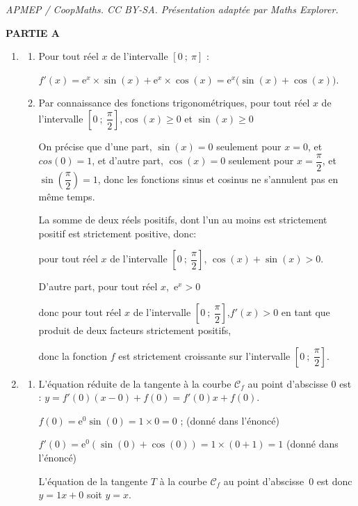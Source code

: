 \documentclass[10pt]{article}
\providecommand{\e}{{\mathrm{e}}}
\begin{document}
\noindent\textit{APMEP / CoopMaths. CC BY-SA. Présentation adaptée par Maths Explorer.}\par\medskip
\medskip

\textbf{PARTIE A}

\medskip

\begin{enumerate}
\item
	\begin{enumerate}
		\item Pour tout réel $x$ de l'intervalle $[0~;~\pi]$ :

$f'(x) = \e^x \times \sin(x) +\e^x \times  \cos(x) = \e^x \big( \sin(x) +\cos(x)\big)$.
		\item Par connaissance des fonctions trigonométriques, pour tout réel $x$ de l'intervalle $\left[0~;~\dfrac{\pi}{2}\right]$,\quad $\cos(x)\geqslant 0$ et $\sin(x)\geqslant 0$

On précise que d'une part, $\sin(x) = 0$ seulement pour $x = 0$, et $cos(0) = 1$, et d'autre part, $\cos(x) = 0$ seulement pour $x = \dfrac{\pi}{2}$, et $\sin\left(\dfrac{\pi}{2}\right)  =1$, donc les fonctions sinus et cosinus ne s'annulent pas en même temps.

La somme de deux réels positifs, dont l'un au moins est strictement positif est strictement positive, donc:

pour tout réel $x$ de l'intervalle $\left[0~;~\dfrac{\pi}{2}\right]$, \quad $\cos(x)+ \sin(x)> 0$.

D'autre part, pour tout réel $x$,\, $\e^{x} > 0$

donc pour tout réel $x$ de l'intervalle $\left[0~;~\dfrac{\pi}{2}\right]$,\quad $f'(x)> 0$ \quad en tant que produit de deux facteurs strictement positifs,

donc  la fonction $f$ est strictement croissante sur l'intervalle  $\left[0~;~\dfrac{\pi}{2}\right]$.
	\end{enumerate}
\item
	\begin{enumerate}
		\item L'équation réduite de la tangente à la courbe $\mathcal{C}_f$ au point d'abscisse 0 est : $y =f'(0)(x - 0) + f(0) = f'(0)x + f(0)$.

$f(0) = \e^0 \sin (0)= 1 \times 0= 0$ ; (donné dans l'énoncé)

$f'(0)= \e^0 \left( \sin(0) +\cos(0)\right) = 1 \times(0+1)=1$ (donné dans l'énoncé)

L'équation de la tangente $T$ à la courbe $\mathcal{C}_f$ au point d'abscisse~$0$ est donc $y = 1x + 0$ soit $y=x$.


\end{enumerate}
\end{enumerate}
\end{document}
